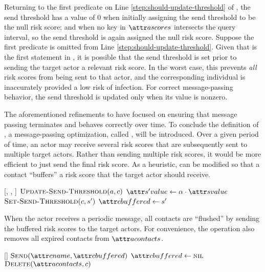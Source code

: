 Returning to the first predicate on Line \ref{step:should-update-threshold} of \cUpdateSendThreshold, the send threshold has a value of 0 when initially assigning the send threshold to be the null risk score; and when no key in $\aActorScores$ intersects the query interval, so the send threshold is again assigned the null risk score. Suppose the first predicate is omitted from Line \ref{step:should-update-threshold}. Given that \cUpdateSendThreshold is the first statement in \cApplyRiskScore, it is possible that the send threshold is set prior to sending the target actor a relevant risk score. In the worst case, this prevents \emph{all} risk scores from being sent to that actor, and the corresponding individual is inaccurately provided a low risk of infection. For correct message-passing behavior, the send threshold is updated only when its value is nonzero.

The aforementioned refinements to \cApplyRiskScore have focused on ensuring that message passing terminates and behaves correctly over time. To conclude the definition of \cApplyRiskScore, a message-passing optimization, called  \citep{McCune2015}, will be introduced. Over a given period of time, an actor may receive several risk scores that are subsequently sent to multiple target actors. Rather than sending multiple risk scores, it would be more efficient to just send the final risk score. As a heuristic, \cApplyRiskScore can be modified so that a contact ``buffers'' a risk score that the target actor should receive.

\begin{function}{\nApplyRiskScore}[\vActor, \vContact, \vScore]
  \State $\cUpdateSendThreshold[\vActor, \vContact]$
  \If{$\aContactThresholdValue < \aScoreValue \AND \aContactTime + \pTimeBuffer > \aScoreTime$}
    \State $\aNewScoreValue \assign \pTransmissionRate \cdot \aScoreValue$
    \State $\cSetSendThreshold[\vContact, \vNewScore]$
    \If{$\aContactName \notEquals \aScoreSender$}
      \State $\aContactBuffered \assign \vNewScore$
    \EndIf
  \EndIf
\end{function}

When the actor receives a periodic  message, all contacts are ``flushed'' by sending the buffered risk scores to the target actors. For convenience, the \cHandleFlushTimeout operation also removes all expired contacts from $\aActorContacts$. 

\begin{function}[H]{\nHandleFlushTimeout}[\vActor]
  \ForEach{$\vContact \in \aActorContacts$}
    \If{$\aContactBuffered \notEquals \nil$}
      \State $\cSend[\aContactName, \aContactBuffered]$
      \State $\aContactBuffered \assign \nil$
    \EndIf
      \State $\cDelete[\aActorContacts, \vContact]$
    \EndIf
  \EndFor
\end{function}

